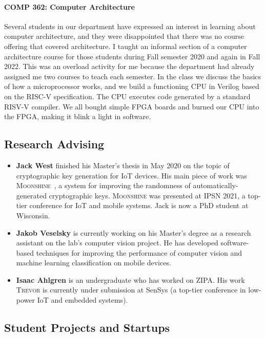 \documentclass[10pt,onecolumn]{article}
\begin{document}
\paragraph{COMP 362: Computer Architecture}
Several students in our department have expressed an interest in learning about computer architecture, and they were disappointed that there was no course offering that covered architecture.
I taught an informal section of a computer architecture course for those students during Fall semester 2020 and again in Fall 2022.
This was an overload activity for me because the department had already assigned me two courses to teach each semester.
In the class we discuss the basics of how a microprocessor works, and we build a functioning CPU in Verilog based on the RISC-V specification.
The CPU executes code generated by a standard RISV-V compiler.
We all bought simple FPGA boards and burned our CPU into the FPGA, making it blink a light in software.

\subsection{Research Advising}


\begin{itemize}
\item \textbf{Jack West} finished his Master's thesis in May 2020 on the topic of cryptographic key generation for IoT devices.
His main piece of work was \textsc{Moonshine}~\cite{moonshine}, a system for improving the randomness of automatically-generated cryptographic keys.
\textsc{Moonshine} was presented at IPSN 2021, a top-tier conference for IoT and mobile systems.
Jack is now a PhD student at Wisconsin.
\item \textbf{Jakob Veselsky} is currently working on his Master's degree as a research assistant on the lab's computer vision project.
He has developed software-based techniques for improving the performance of computer vision and machine learning classification on mobile devices.
\item \textbf{Isaac Ahlgren} is an undergraduate who has worked on ZIPA.
His work \textsc{Trevor} is currently under submission at SenSys (a top-tier conference in low-power IoT and embedded systems).
\end{itemize}

\subsection{Student Projects and Startups}
\end{document}
